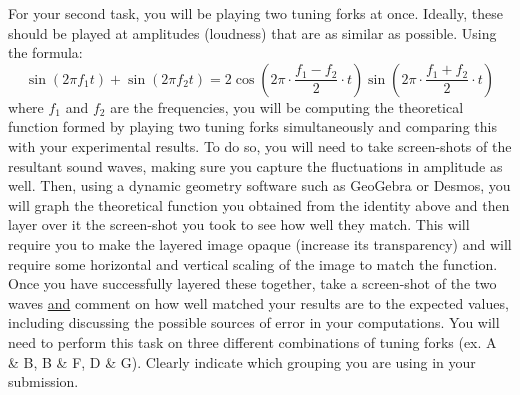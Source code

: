 \documentclass[12pt,oneside]{article}
\newcommand{\dss}{\displaystyle}
\begin{document}
\begin{tcolorbox}[breakable, enhanced, colframe=blue!25,
colback=white!10,
coltitle=blue!20!black,  
title= {\bf Task 2: Combining Sinusoidals.}] 
For your second task, you will be playing two tuning forks at once. Ideally, these should be played at amplitudes (loudness) that are as similar as possible. Using the formula:
$$\sin\left(2\pi f_1 t\right) + \sin\left(2\pi f_2 t\right) = 2\cos\left(2\pi\cdot \dss\frac{f_1-f_2}{2}\cdot t\right)\sin\left(2\pi\cdot \dss\frac{f_1+f_2}{2}\cdot t\right)$$
where $f_1$ and $f_2$ are the frequencies, you will be computing the theoretical function formed by playing two tuning forks simultaneously and comparing this with your experimental results. To do so, you will need to take screen-shots of the resultant sound waves, making sure you capture the fluctuations in amplitude as well. Then, using a dynamic geometry software such as GeoGebra or Desmos, you will graph the theoretical function you obtained from the identity above and then layer over it the screen-shot you took to see how well they match. This will require you to make the layered image opaque (increase its transparency) and will require some horizontal and vertical scaling of the image to match the function. Once you have successfully layered these together, take a screen-shot of the two waves \underline{and} comment on how well matched your results are to the expected values, including discussing the possible sources of error in your computations. You will need to perform this task on three different combinations of tuning forks (ex. A \& B, B \& F, D \& G). Clearly indicate which grouping you are using in your submission.\\
\end{tcolorbox}




\end{document}

